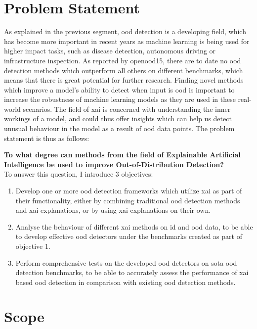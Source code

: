 \documentclass[UKenglish]{uiomasterthesis} %
\theoremstyle{definition}
\begin{document}
\section{Problem Statement} \label{section:problemstatement}

As explained in the previous segment, \ac{ood} detection is a developing field, which has become more important in recent years as machine learning is being used for higher impact tasks, such as disease detection, autonomous driving or infrastructure inspection. As reported by \ac{openood15}, there are to date no \ac{ood} detection methods which outperform all others on different benchmarks, which means that there is great potential for further research. Finding novel methods which improve a model's ability to detect when input is \ac{ood} is important to increase the robustness of machine learning models as they are used in these real-world scenarios. The field of \ac{xai} is concerned with understanding the inner workings of a model, and could thus offer insights which can help us detect unusual behaviour in the model as a result of \ac{ood} data points. The problem statement is thus as follows:

\textbf{To what degree can methods from the field of Explainable Artificial Intelligence be used to improve Out-of-Distribution Detection?}
\\

To answer this question, I introduce 3 objectives:

\begin{enumerate}
    \item Develop one or more \ac{ood} detection frameworks which utilize \ac{xai} as part of their functionality, either by combining traditional \ac{ood} detection methods and \ac{xai} explanations, or by using \ac{xai} explanations on their own.
    \item Analyse the behaviour of different \ac{xai} methods on \ac{id} and \ac{ood} data, to be able to develop effective \ac{ood} detectors under the benchmarks created as part of objective 1.
    \item Perform comprehensive tests on the developed \ac{ood} detectors on \ac{sota} \ac{ood} detection benchmarks, to be able to accurately assess the performance of \ac{xai} based \ac{ood} detection in comparison with existing \ac{ood} detection methods.
\end{enumerate}

\section{Scope} \label{section:scope}
\end{document}
